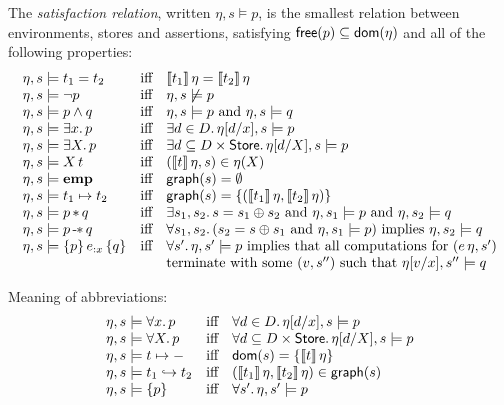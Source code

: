 \documentclass[12pt,a4paper]{article}
\newcommand{\emp}{\ensuremath{\mathbf{emp}}}
\begin{document}
\begin{definition}
  The {\em satisfaction relation}, written $\eta,s \models p$, is the smallest relation between 
  environments, stores and assertions, satisfying $\mathsf{free}(p) \subseteq \mathsf{dom}(\eta)$ and all of the
  following properties:
  \[\begin{array}{lcl}
    \eta,s \models t_1 = t_2
    &\text{iff}& \semantic{t_1}\,\eta = \semantic{t_2}\,\eta \\
    \eta,s \models \neg p
    &\text{iff}& \eta,s \not\models p \\
    \eta,s \models p \wedge q
    &\text{iff}& \eta,s \models p \text{ and } \eta,s \models q \\
    \eta,s \models \exists x.\,p
    &\text{iff}& \exists d \in D.\,\eta[d/x],s \models p \\
    \eta,s \models \exists X.\,p
    &\text{iff}& \exists d \subseteq D \times \Store.\,\eta[d/X],s \models p \\
    \eta,s \models \app{X}{t}
    &\text{iff}& (\semantic{t}\,\eta,s) \in \eta(X) \\
    \eta,s \models \emp
    &\text{iff}& \grph{s} = \emptyset \\
    \eta,s \models t_1 \mapsto t_2
    &\text{iff}& \grph{s} = \{(\semantic{t_1}\,\eta,\semantic{t_2}\,\eta)\} \\
    \eta,s \models p \sepcon q
    &\text{iff}& \exists s_1,s_2.\,s=s_1 \oplus s_2 \text{ and } \eta,s_1 \models p \text{ and } \eta,s_2 \models q \\
    \eta,s \models p \sepimp q
    &\text{iff}& \forall s_1,s_2.\,(s_2 = s \oplus s_1 \text{ and } \eta,s_1 \models p) \text{ implies } \eta,s_2 \models q \\
    \eta,s \models \triplex{p}{e}{x}{q}
    &\text{iff}& \forall s'.\,\eta,s' \models p \text{ implies that all computations for } (e\,\eta,s') \\
    && \text{terminate with some $(v,s'')$ such that } \eta[v/x],s'' \models q
  \end{array}\]
\end{definition}

Meaning of abbreviations:
\[\begin{array}{lcl}
  \eta,s \models \forall x.\,p
  &\text{iff}& \forall d\in D.\,\eta[d/x],s \models p \\
  \eta,s \models \forall X.\,p
  &\text{iff}& \forall d \subseteq D \times \mathsf{Store}.\,\eta[d/X],s \models p \\
  \eta,s \models t \mapsto -
  &\text{iff}& \mathsf{dom}(s) = \{\llbracket t\rrbracket\,\eta\} \\
  \eta,s \models t_1 \hookrightarrow t_2
  &\text{iff}& (\llbracket t_1\rrbracket\,\eta,\llbracket t_2\rrbracket\,\eta)\in\mathsf{graph}(s) \\
  \eta,s \models \{p\}
  &\text{iff}& \forall s'.\,\eta,s' \models p
\end{array}\]
\end{document}
